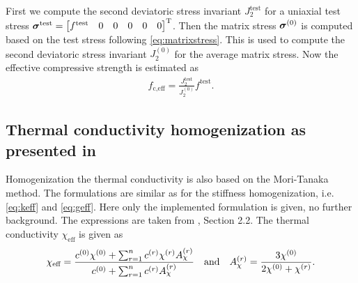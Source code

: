 First we compute the second deviatoric stress invariant $J_2^{\text{test}}$ for a uniaxial test stress $\boldsymbol{\sigma}^{\text{test}} = \begin{bmatrix} f^{\text{test}} & 0 & 0 &0&0&0 \end{bmatrix}^\text{T}$. Then the matrix stress $\boldsymbol{\sigma}^{(0)}$ is computed based on the test stress following \eqref{eq:matrixstress}. This is used to compute the second deviatoric stress invariant $J_2^{(0)}$ for the average matrix stress.
Now the effective compressive strength is estimated as
\begin{align}
	f_{\text{c,eff}} = \frac{J_2^{\text{test}}}{J_2^{(0)}}  f^{\text{test}}.
\end{align}


\subsection{Thermal conductivity homogenization as presented in \cite{str_2011_mbeo}}
Homogenization the thermal conductivity is also based on the Mori-Tanaka method.
The formulations are similar as for the stiffness homogenization, i.e. \eqref{eq:keff} and \eqref{eq:geff}.
Here only the implemented formulation is given, no further background.
The expressions are taken from \cite{str_2011_mbeo}, Section 2.2.
The thermal conductivity $\chi_{\text{eff}}$ is given as
\begin{align}
	\chi_{\text{eff}} = \dfrac{c^{(0)}\chi^{(0)} + \sum^{n}_{r=1} c^{(r)} \chi^{(r)} A_{\chi}^{(r)}}{c^{(0)} + \sum^{n}_{r=1} c^{(r)} A_{\chi}^{(r)}}\quad\text{and}\quad
	A_{\chi}^{(r)} = \frac{3\chi^{(0)}}{2\chi^{(0)}+\chi^{(r)}}.
\end{align}

